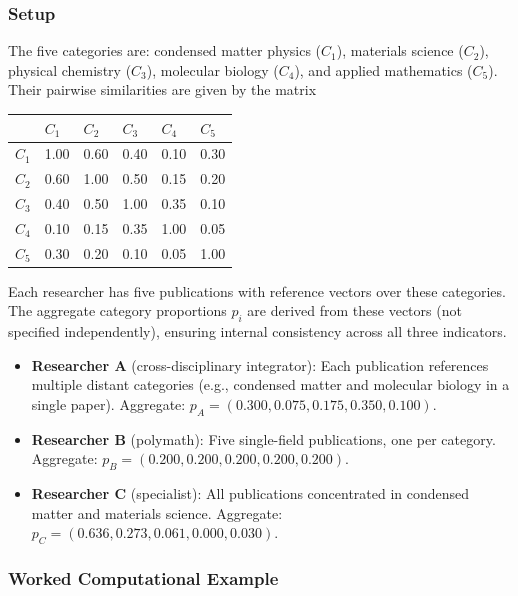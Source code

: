 \documentclass[
]{article}
\providecommand{\tightlist}{%
  \setlength{\itemsep}{0pt}\setlength{\parskip}{0pt}}
\begin{document}
\hypertarget{setup}{%
\subsubsection{Setup}\label{setup}}

The five categories are: condensed matter physics (\(C_1\)), materials
science (\(C_2\)), physical chemistry (\(C_3\)), molecular biology
(\(C_4\)), and applied mathematics (\(C_5\)). Their pairwise
similarities are given by the matrix

\begin{longtable}[]{@{}llllll@{}}
\toprule
& \(C_1\) & \(C_2\) & \(C_3\) & \(C_4\) & \(C_5\) \\
\midrule
\endhead
\(C_1\) & 1.00 & 0.60 & 0.40 & 0.10 & 0.30 \\
\(C_2\) & 0.60 & 1.00 & 0.50 & 0.15 & 0.20 \\
\(C_3\) & 0.40 & 0.50 & 1.00 & 0.35 & 0.10 \\
\(C_4\) & 0.10 & 0.15 & 0.35 & 1.00 & 0.05 \\
\(C_5\) & 0.30 & 0.20 & 0.10 & 0.05 & 1.00 \\
\bottomrule
\end{longtable}

Each researcher has five publications with reference vectors over these
categories. The aggregate category proportions \(p_i\) are derived from
these vectors (not specified independently), ensuring internal
consistency across all three indicators.

\begin{itemize}
\tightlist
\item
  \textbf{Researcher A} (cross-disciplinary integrator): Each
  publication references multiple distant categories (e.g., condensed
  matter and molecular biology in a single paper). Aggregate:
  \(p_A = (0.300, 0.075, 0.175, 0.350, 0.100)\).
\item
  \textbf{Researcher B} (polymath): Five single-field publications, one
  per category. Aggregate:
  \(p_B = (0.200, 0.200, 0.200, 0.200, 0.200)\).
\item
  \textbf{Researcher C} (specialist): All publications concentrated in
  condensed matter and materials science. Aggregate:
  \(p_C = (0.636, 0.273, 0.061, 0.000, 0.030)\).
\end{itemize}

\hypertarget{worked-computational-example}{%
\subsubsection{Worked Computational
Example}\label{worked-computational-example}}
\end{document}
